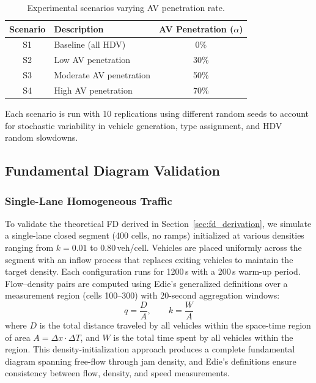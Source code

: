 \documentclass[review,authoryear]{elsarticle}
\begin{document}
\begin{table}[ht]
\centering
\caption{Experimental scenarios varying AV penetration rate.}
\label{tab:scenarios}
\begin{tabular}{@{}clc@{}}
\toprule
Scenario & Description & AV Penetration ($\alpha$) \\
\midrule
S1 & Baseline (all HDV) & 0\% \\
S2 & Low AV penetration & 30\% \\
S3 & Moderate AV penetration & 50\% \\
S4 & High AV penetration & 70\% \\
\bottomrule
\end{tabular}
\end{table}

Each scenario is run with 10 replications using different random seeds to account for stochastic variability in vehicle generation, type assignment, and HDV random slowdowns.


\subsection{Fundamental Diagram Validation}
\label{sec:exp_fd}

\subsubsection{Single-Lane Homogeneous Traffic}

To validate the theoretical FD derived in Section~\ref{sec:fd_derivation}, we simulate a single-lane closed segment (400 cells, no ramps) initialized at various densities ranging from $k = 0.01$ to $0.80$\,veh/cell. Vehicles are placed uniformly across the segment with an inflow process that replaces exiting vehicles to maintain the target density. Each configuration runs for 1200\,s with a 200\,s warm-up period. Flow--density pairs are computed using Edie's generalized definitions \citep{edie1963discussion} over a measurement region (cells 100--300) with 20-second aggregation windows:
\begin{equation}
    q = \frac{D}{A}, \qquad k = \frac{W}{A}
    \label{eq:fd_measurement}
\end{equation}
where $D$ is the total distance traveled by all vehicles within the space-time region of area $A = \Delta x \cdot \Delta T$, and $W$ is the total time spent by all vehicles within the region. This density-initialization approach produces a complete fundamental diagram spanning free-flow through jam density, and Edie's definitions ensure consistency between flow, density, and speed measurements.
\end{document}
